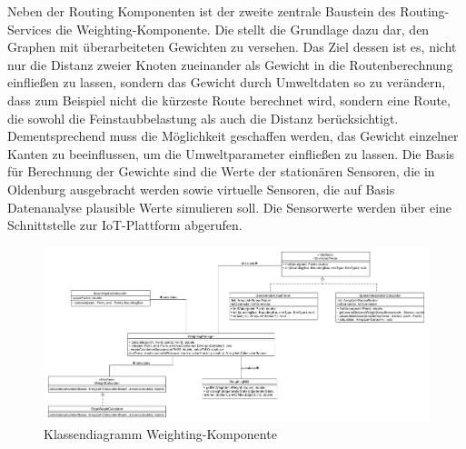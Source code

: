 Neben der Routing Komponenten ist der zweite zentrale Baustein des Routing-Services die Weighting-Komponente. Die stellt die Grundlage dazu dar, den Graphen mit überarbeiteten Gewichten zu versehen. Das Ziel dessen ist es, nicht nur die Distanz zweier Knoten zueinander als Gewicht in die Routenberechnung einfließen zu lassen, sondern das Gewicht durch Umweltdaten so zu verändern, dass zum Beispiel nicht die kürzeste Route berechnet wird, sondern eine Route, die sowohl die Feinstaubbelastung als auch die Distanz berücksichtigt. Dementsprechend muss die Möglichkeit geschaffen werden, das Gewicht einzelner Kanten zu beeinflussen, um die Umweltparameter einfließen zu lassen.
Die Basis für Berechnung der Gewichte sind die Werte der stationären Sensoren, die in Oldenburg ausgebracht werden sowie virtuelle Sensoren, die auf Basis Datenanalyse plausible Werte simulieren soll. Die Sensorwerte werden über eine Schnittstelle zur IoT-Plattform abgerufen.


\begin{figure}[htb]
	\centering
	\includegraphics[width=\textwidth]{./ressourcen/routing/cdWeighting.png}
	\caption{Klassendiagramm Weighting-Komponente}
	\label{fig:weighting_Klassendiagramm}
\end{figure}


